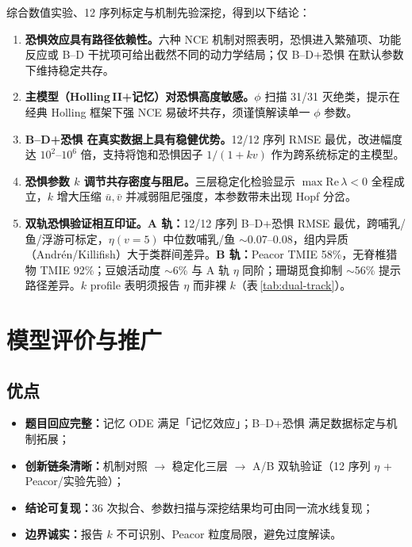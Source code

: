 \documentclass[12pt,a4paper]{ctexart}
\begin{document}
综合数值实验、12 序列标定与机制先验深挖，得到以下结论：

\begin{enumerate}[label=\arabic*.,leftmargin=2em]
  \item \textbf{恐惧效应具有路径依赖性。}六种 NCE 机制对照表明，恐惧进入繁殖项、功能反应或 B--D 干扰项可给出截然不同的动力学结局；仅 B--D+恐惧 在默认参数下维持稳定共存。
  \item \textbf{主模型（Holling\,II+记忆）对恐惧高度敏感。}$\phi$ 扫描 31/31 灭绝类，提示在经典 Holling 框架下强 NCE 易破坏共存，须谨慎解读单一 $\phi$ 参数。
  \item \textbf{B--D+恐惧 在真实数据上具有稳健优势。}12/12 序列 RMSE 最优，改进幅度达 $10^2$--$10^6$ 倍，支持将饱和恐惧因子 $1/(1+kv)$ 作为跨系统标定的主模型。
  \item \textbf{恐惧参数 $k$ 调节共存密度与阻尼。}三层稳定化检验显示 $\max\mathrm{Re}\,\lambda<0$ 全程成立，$k$ 增大压缩 $\bar{u},\bar{v}$ 并减弱阻尼强度，本参数带未出现 Hopf 分岔。
  \item \textbf{双轨恐惧验证相互印证。}\textbf{A 轨：}12/12 序列 B--D+恐惧 RMSE 最优，跨哺乳/鱼/浮游可标定，$\eta(v=5)$ 中位数哺乳/鱼 $\sim$0.07--0.08，组内异质（Andrén/Killifish）大于类群间差异。\textbf{B 轨：}Peacor TMIE 58\%，无脊椎猎物 TMIE 92\%；豆娘活动度 $\sim$6\% 与 A 轨 $\eta$ 同阶；珊瑚觅食抑制 $\sim$56\% 提示路径差异。$k$ profile 表明须报告 $\eta$ 而非裸 $k$（表\,\ref{tab:dual-track}）。
\end{enumerate}

\section{模型评价与推广}
\label{sec:eval}

\subsection{优点}

\begin{itemize}[leftmargin=2em]
  \item \textbf{题目回应完整：}记忆 ODE 满足「记忆效应」；B--D+恐惧 满足数据标定与机制拓展；
  \item \textbf{创新链条清晰：}机制对照 $\rightarrow$ 稳定化三层 $\rightarrow$ A/B 双轨验证（12 序列 $\eta$ + Peacor/实验先验）；
  \item \textbf{结论可复现：}36 次拟合、参数扫描与深挖结果均可由同一流水线复现；
  \item \textbf{边界诚实：}报告 $k$ 不可识别、Peacor 粒度局限，避免过度解读。
\end{itemize}
\end{document}
